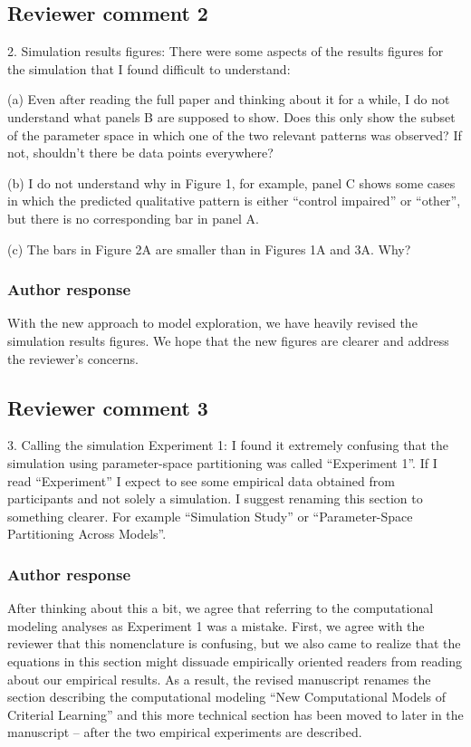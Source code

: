 \documentclass[12pt]{article}
\begin{document}
\subsection{Reviewer comment 2}
2. Simulation results figures: There were some aspects of
the results figures for the simulation that I found
difficult to understand:

(a) Even after reading the full paper and thinking about it
for a while, I do not understand what panels B are supposed
to show. Does this only show the subset of the parameter
space in which one of the two relevant patterns was
observed? If not, shouldn't there be data points everywhere?

(b) I do not understand why in Figure 1, for example, panel
C shows some cases in which the predicted qualitative
pattern is either ``control impaired'' or ``other'', but there
is no corresponding bar in panel A.

(c) The bars in Figure 2A are smaller than in Figures 1A and
3A. Why?

\subsubsection{Author response}
With the new approach to model exploration, we have heavily
revised the simulation results figures.  We hope that the
new figures are clearer and address the reviewer's concerns.

\subsection{Reviewer comment 3}
3. Calling the simulation Experiment 1: I found it extremely
confusing that the simulation using parameter-space
partitioning was called ``Experiment 1''. If I read
``Experiment'' I expect to see some empirical data obtained
from participants and not solely a simulation. I suggest
renaming this section to something clearer. For example
``Simulation Study'' or ``Parameter-Space Partitioning
Across
Models''.

\subsubsection{Author response}
After thinking about this a bit, we agree that referring to
the computational modeling analyses as Experiment 1 was a
mistake. First, we agree with the reviewer that this
nomenclature is confusing, but we also came to realize that
the equations in this section might dissuade empirically
oriented readers from reading about our empirical results.
As a result, the revised manuscript renames the section
describing the computational modeling ``New Computational
Models of Criterial Learning'' and this more technical
section has been moved to later in the manuscript -- after
the two empirical experiments are described. 
\end{document}
